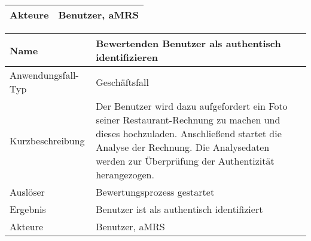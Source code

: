 \begin{table}[H]
\begin{tabularx}{\textwidth}{| l | X |}
        \hline
        Akteure            & Benutzer, \ac{aMRS}                                                                                                                                                                                                                                                                                                                                                                                                                                 \\
        \hline
    \end{tabularx}
\end{table}



\begin{table}[H]
    \centering
    \label{}
    \begin{tabularx}{\textwidth}{| l | X |}
        \hline
        Name               & Bewertenden Benutzer als authentisch identifizieren                                                                                                                                                                              \\
        \hline
        Anwendungsfall-Typ & Geschäftsfall                                                                                                                                                                                                                    \\
        \hline
        Kurzbeschreibung   & Der Benutzer wird dazu aufgefordert ein Foto seiner Restaurant-Rechnung zu machen und dieses hochzuladen. Anschließend startet die Analyse der Rechnung. Die Analysedaten werden zur Überprüfung der Authentizität herangezogen. \\
        \hline
        Auslöser           & Bewertungsprozess gestartet                                                                                                                                                                                                      \\
        \hline
        Ergebnis           & Benutzer ist als authentisch identifiziert                                                                                                                                                                                       \\
        \hline
        Akteure            & Benutzer, \ac{aMRS}                                                                                                                                                                                                              \\
        \hline
    \end{tabularx}
\end{table}

